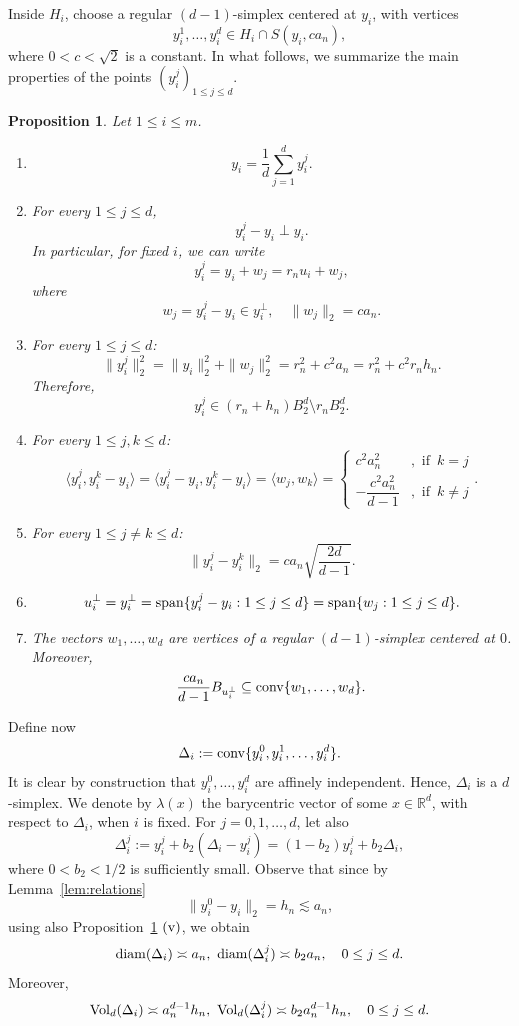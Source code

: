 \documentclass[10pt]{amsart}
\newcommand{\1}{\textbf{1}}
\newcommand{\conv}{{\rm conv}}
\newcommand{\vol}{{\rm Vol}}
\newcommand{\diam}{{\rm diam}}
\numberwithin{equation}{section} %
\newtheorem{proposition}[theorem]{Proposition}
\theoremstyle{remark}
\theoremstyle{definition}
\begin{document}
Inside \(H_i\), choose a regular \((d-1)\)-simplex centered at \(y_i\), with vertices
\[
y_i^1,\ldots,y_i^d\in H_i\cap S(y_i,ca_n),
\]
where \(0<c<\sqrt{2}\) is a constant. In what follows, we summarize the main properties of the points $(y_i^j)_{1 \leq j \leq d}$.
\begin{proposition}\label{prop:main-properties} 
Let $1 \leq i \leq m$.
\begin{enumerate}
\item[{\rm (i)}] \[y_i=\frac{1}{d}\sum_{j=1}^d y_i^j.\]
\item[{\rm (ii)}] For every $1 \leq j \leq d$, \[y_i^j-y_i \perp y_i.\] In particular, for fixed $i$, we can write \[y_i^j=y_i+w_j=r_nu_i+w_j,\] where \[w_j=y_i^j-y_i \in y_i^\perp, \quad \|w_j\|_2=ca_n.\]
\item[{\rm (iii)}]For every $1 \leq j \leq d$: \[\|y_i^j\|_2^2=\|y_i\|_2^2+\|w_j\|_2^2=r_n^2+c^2a_n=r_n^2+c^2r_nh_n.\] 
Therefore, \[y_i^j \in (r_n+h_n)B_2^d \setminus r_nB_2^d.\]
\item[{\rm (iv)}] For every $1 \leq j,k \leq d$: \[\langle y_i^j,y_i^k-y_i\rangle=\langle y_i^j-y_i,y_i^k-y_i\rangle= \langle w_j,w_k \rangle= \begin{cases}
c^2a_n^2 &, \text{ if } \, k=j\\
-\dfrac{c^2a_n^2}{d-1} &, \text{ if } \, k \neq j
\end{cases}.\]
\item[{\rm (v)}] For every $1\leq j \neq k \leq d$:  \[\|y_i^j-y_i^k\|_2=ca_n\sqrt{\frac{2d}{d-1}}.\]
\item[{\rm (vi)}] \[u_i^\perp=y_i^\perp={\rm span}\{y_i^j-y_i:1 \leq j \leq d \}={\rm span}\{w_j:1 \leq j \leq d \}.\]
\item[{\rm (vii)}] The vectors $w_1,\ldots,w_d$ are vertices of a regular $(d-1)$-simplex centered at $0$. Moreover, \[\frac{ca_n}{d-1}B_{u_i^\perp} \subseteq \conv\{w_1,\ldots,w_d\}.\]

\end{enumerate}
    
\end{proposition}

Define now
\[
\Delta_i:=\conv\{y_i^0,y_i^1,\ldots,y_i^d\}.
\]
It is clear by construction that $y_i^0,\ldots,y_i^d$ are affinely independent. Hence, $\Delta_i$ is a $d$-simplex. We denote by $\lambda(x)$ the barycentric vector of some $x \in \mathbb{R}^d$, with respect to $\Delta_i$, when $i$ is fixed.
For \(j=0,1,\ldots,d\), let also
\[
\Delta_i^j:=y_i^j+b_2(\Delta_i-y_i^j)=(1-b_2)y_i^j+b_2\Delta_i,
\]
where \(0<b_2<1/2\) is sufficiently small. Observe  that since by Lemma~\ref{lem:relations} \[\|y_i^0-y_i\|_2=h_n \lesssim a_n,\] using also Proposition~\ref{prop:main-properties} ${\rm (v)}$, we obtain \begin{equation}\label{eq:simplices-diam}
\diam(\Delta_i) \asymp a_n, \ \diam( \Delta_i^j) \asymp b_2a_n, \quad 0\leq j \leq d.
\end{equation}
Moreover, \begin{equation}\label{eq:simplices-volume-asymptotics}
\vol_d(\Delta_i)\asymp a_n^{d-1}h_n, \ \vol_d(\Delta_i^j)\asymp b_2 a_n^{d-1}h_n , \quad 0\leq j \leq d.
\end{equation}
\end{document}
